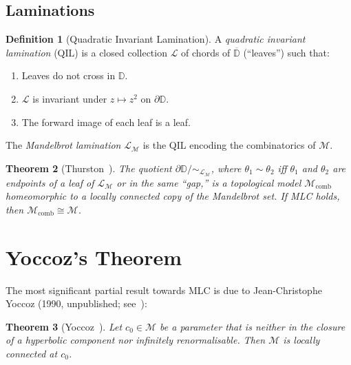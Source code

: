 \documentclass[12pt,a4paper]{amsart}
\newtheorem{theorem}{Theorem}[section]
\theoremstyle{definition}
\newtheorem{definition}[theorem]{Definition}
\theoremstyle{remark}
\begin{document}
\subsection{Laminations}

\begin{definition}[Quadratic Invariant Lamination]
A \emph{quadratic invariant lamination} (QIL) is a closed collection
$\mathcal{L}$ of chords of $\overline{\mathbb{D}}$ (``leaves'') such that:
\begin{enumerate}[label=\roman*)]
\item Leaves do not cross in $\mathbb{D}$.
\item $\mathcal{L}$ is invariant under $z \mapsto z^2$ on $\partial \mathbb{D}$.
\item The forward image of each leaf is a leaf.
\end{enumerate}
The \emph{Mandelbrot lamination} $\mathcal{L}_{\mathcal{M}}$ is the
QIL encoding the combinatorics of $\mathcal{M}$.
\end{definition}

\begin{theorem}[Thurston~\cite{Thurston1985}]
The quotient $\partial \mathbb{D} / \sim_{\mathcal{L}_{\mathcal{M}}}$,
where $\theta_1 \sim \theta_2$ iff $\theta_1$ and $\theta_2$ are
endpoints of a leaf of $\mathcal{L}_{\mathcal{M}}$ or in the same
``gap,'' is a topological model $\mathcal{M}_{\mathrm{comb}}$
homeomorphic to a locally connected copy of the Mandelbrot set.
If MLC holds, then $\mathcal{M}_{\mathrm{comb}} \cong \mathcal{M}$.
\end{theorem}

\section{Yoccoz's Theorem}

The most significant partial result towards MLC is due to Jean-Christophe
Yoccoz (1990, unpublished; see~\cite{HubbardSchleicher1994,Milnor2000}):

\begin{theorem}[Yoccoz~\cite{HubbardSchleicher1994}]
\label{thm:Yoccoz}
Let $c_0 \in \mathcal{M}$ be a parameter that is neither in the closure
of a hyperbolic component nor infinitely renormalisable. Then $\mathcal{M}$
is locally connected at $c_0$.
\end{theorem}
\end{document}
